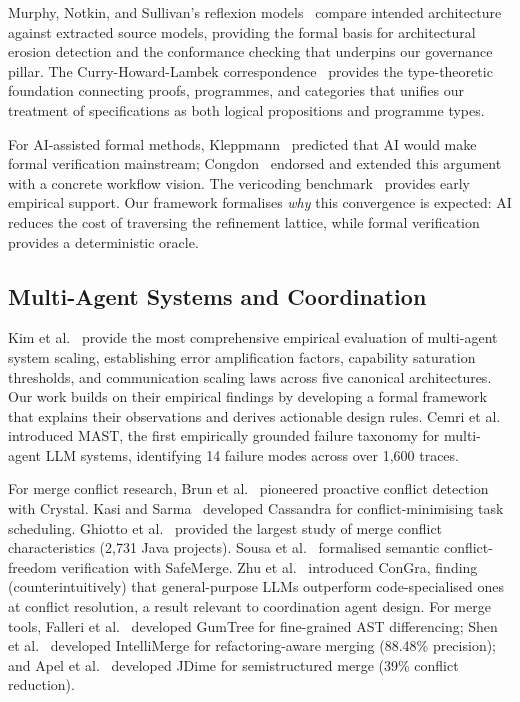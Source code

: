 Murphy, Notkin, and Sullivan's reflexion models~\citep{murphy1995, murphy2001}
compare intended architecture against extracted source models, providing the
formal basis for architectural erosion detection and the conformance checking
that underpins our governance pillar.  The Curry-Howard-Lambek
correspondence~\citep{wadler2015propositions} provides the type-theoretic
foundation connecting proofs, programmes, and categories that unifies our
treatment of specifications as both logical propositions and programme types.

For AI-assisted formal methods, Kleppmann~\citep{kleppmann2025formal} predicted
that AI would make formal verification mainstream;
Congdon~\citep{congdon2025formal} endorsed and extended this argument with a
concrete workflow vision.  The vericoding benchmark~\citep{vericoding2025}
provides early empirical support.  Our framework formalises \emph{why} this
convergence is expected: AI reduces the cost of traversing the refinement
lattice, while formal verification provides a deterministic oracle.


\subsection{Multi-Agent Systems and Coordination}

Kim et al.~\citep{kim2025scaling} provide the most comprehensive empirical
evaluation of multi-agent system scaling, establishing error amplification
factors, capability saturation thresholds, and communication scaling laws across
five canonical architectures.  Our work builds on their empirical findings by
developing a formal framework that explains their observations and derives
actionable design rules.  Cemri et al.~\citep{Cemri2025} introduced MAST, the
first empirically grounded failure taxonomy for multi-agent LLM systems,
identifying 14 failure modes across over 1,600 traces.

For merge conflict research, Brun et al.~\citep{Brun2011} pioneered proactive
conflict detection with Crystal.  Kasi and Sarma~\citep{KasiSarma2013}
developed Cassandra for conflict-minimising task scheduling.  Ghiotto
et al.~\citep{Ghiotto2018} provided the largest study of merge conflict
characteristics (2,731 Java projects).  Sousa et al.~\citep{Sousa2018}
formalised semantic conflict-freedom verification with SafeMerge.  Zhu
et al.~\citep{Zhu2024congra} introduced ConGra, finding (counterintuitively)
that general-purpose LLMs outperform code-specialised ones at conflict
resolution, a result relevant to coordination agent design.  For merge tools,
Falleri et al.~\citep{Falleri2014} developed GumTree for fine-grained AST
differencing; Shen et al.~\citep{Shen2019} developed IntelliMerge for
refactoring-aware merging (88.48\% precision); and Apel et al.~\citep{Apel2012}
developed JDime for semistructured merge (39\% conflict reduction).

